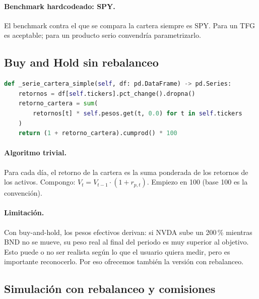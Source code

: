 \documentclass[11pt,a4paper]{book}
\begin{document}
\paragraph{Benchmark hardcodeado: SPY.} El benchmark contra el que se compara la cartera siempre es SPY. Para un TFG es aceptable; para un producto serio convendría parametrizarlo.

\subsection{Buy and Hold sin rebalanceo}

\begin{lstlisting}[language=Python]
def _serie_cartera_simple(self, df: pd.DataFrame) -> pd.Series:
    retornos = df[self.tickers].pct_change().dropna()
    retorno_cartera = sum(
        retornos[t] * self.pesos.get(t, 0.0) for t in self.tickers
    )
    return (1 + retorno_cartera).cumprod() * 100
\end{lstlisting}

\paragraph{Algoritmo trivial.} Para cada día, el retorno de la cartera es la suma ponderada de los retornos de los activos. Compongo: $V_t = V_{t-1} \cdot (1 + r_{p,t})$. Empiezo en 100 (base 100 es la convención).

\paragraph{Limitación.} Con buy-and-hold, los pesos efectivos derivan: si NVDA sube un 200\,\% mientras BND no se mueve, su peso real al final del periodo es muy superior al objetivo. Esto puede o no ser realista según lo que el usuario quiera medir, pero es importante reconocerlo. Por eso ofrecemos también la versión con rebalanceo.

\subsection{Simulación con rebalanceo y comisiones}
\end{document}
